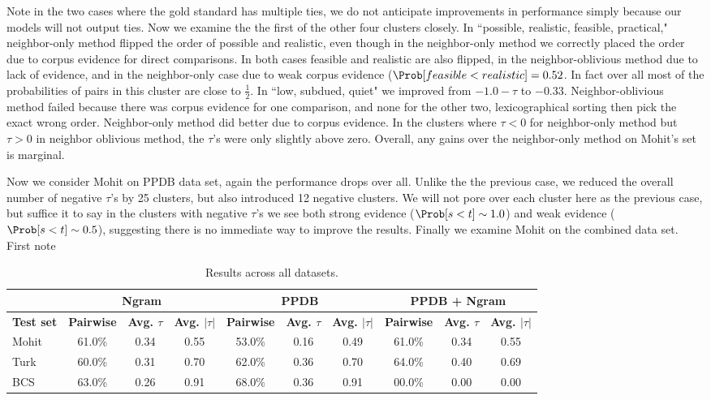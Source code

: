 Note in the two cases where the gold standard has multiple ties, we do not anticipate improvements in performance simply because our models will not output ties. Now we examine the the first of the other four clusters closely. In ``possible, realistic, feasible, practical," neighbor-only method flipped the order of possible and realistic, even though in the neighbor-only method we correctly placed the order due to corpus evidence for direct comparisons. In both cases feasible and realistic are also flipped, in the neighbor-oblivious method due to lack of evidence, and in the neighbor-only case due to weak corpus evidence ($\Prob[ feasible < realistic ] = 0.52$. In fact over all most of the probabilities of pairs in this cluster are close to $\frac{1}{2}$. In ``low, subdued, quiet" we improved from $-1.0-\tau$ to $-0.33$. Neighbor-oblivious method failed because there was corpus evidence for one comparison, and none for the other two, lexicographical sorting then pick the exact wrong order. Neighbor-only method did better due to corpus evidence. In the clusters where $\tau <  0$ for neighbor-only method but $\tau > 0$ in neighbor oblivious method, the $\tau$'s were only slightly above zero. Overall, any gains over the neighbor-only method on Mohit's set is marginal.

Now we consider Mohit on PPDB data set, again the performance drops over all. Unlike the the previous case, we reduced the overall number of negative $\tau$'s by 25 clusters, but also introduced 12 negative clusters. We will not pore over each cluster here as the previous case, but suffice it to say in the clusters with negative $\tau$'s we see both strong evidence ($\Prob[s < t] \sim 1.0$) and weak evidence ($\Prob[s < t] \sim 0.5$), suggesting there is no immediate way to improve the results. Finally we examine Mohit on the combined data set. First note 



\begin{table}
\small
\centering
\begin{tabular}{|l|ccc|ccc|ccc|}
	\hline 
	& \multicolumn{3}{c|}{Ngram} 
	& \multicolumn{3}{c|}{PPDB} 
	& \multicolumn{3}{c|}{PPDB + Ngram} \\
	\hline 
	\bf Test set
	& \bf Pairwise & \bf Avg. $\tau$ & \bf Avg. $|\tau|$ 
	& \bf Pairwise & \bf Avg. $\tau$ & \bf Avg. $|\tau|$ 
	& \bf Pairwise & \bf Avg. $\tau$ & \bf Avg. $|\tau|$ \\ 
	\hline
	Mohit & 61.0\%  & 0.34 & 0.55  & 53.0\% & 0.16 & 0.49 & 61.0\% & 0.34 & 0.55 \\ 
	Turk  & 60.0\%  & 0.31 & 0.70  & 62.0\% & 0.36 & 0.70 & 64.0\% & 0.40 & 0.69 \\
	BCS   & 63.0\%  & 0.26 & 0.91  & 68.0\% & 0.36 & 0.91 & 00.0\% & 0.00 & 0.00 \\
	\hline
\end{tabular}
\caption{\label{font-table} Results across all datasets. }
\end{table}
